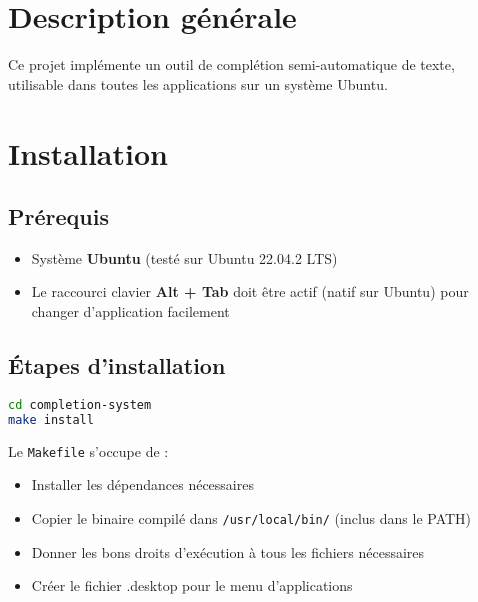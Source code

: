 


% 


\section*{Description générale}

Ce projet implémente un outil de complétion semi-automatique de texte, utilisable dans toutes les applications sur un système Ubuntu.

\section*{Installation}

\subsection*{Prérequis}

\begin{itemize}
	\item Système \textbf{Ubuntu} (testé sur Ubuntu 22.04.2 LTS)
	\item Le raccourci clavier \textbf{Alt + Tab} doit être actif (natif sur Ubuntu) pour changer d'application facilement
\end{itemize}

\subsection*{Étapes d'installation}

\begin{lstlisting}[language=bash]
cd completion-system
make install
\end{lstlisting}

Le \texttt{Makefile} s’occupe de :
\begin{itemize}
	\item Installer les dépendances nécessaires
	\item Copier le binaire compilé dans \texttt{/usr/local/bin/} (inclus dans le PATH)
	\item Donner les bons droits d’exécution à tous les fichiers nécessaires
	\item Créer le fichier .desktop pour le menu d’applications
\end{itemize}

